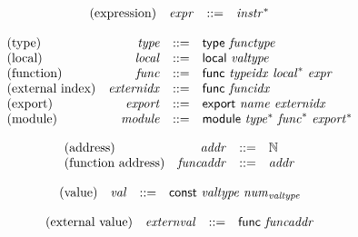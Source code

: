 \documentclass{article}
\begin{document}
\vspace{1ex}

$$
\begin{array}{@{}lrrl@{}l@{}}
	\mbox{(expression)} & {\mathit{expr}} &::=& {{\mathit{instr}}^\ast} \\
\end{array}
$$

\vspace{1ex}

$$
\begin{array}{@{}lrrl@{}l@{}}
	\mbox{(type)} & {\mathit{type}} &::=& \mathsf{type}~{\mathit{functype}} \\
	\mbox{(local)} & {\mathit{local}} &::=& \mathsf{local}~{\mathit{valtype}} \\
	\mbox{(function)} & {\mathit{func}} &::=& \mathsf{func}~{\mathit{typeidx}}~{{\mathit{local}}^\ast}~{\mathit{expr}} \\
	\mbox{(external index)} & {\mathit{externidx}} &::=& \mathsf{func}~{\mathit{funcidx}} \\
	\mbox{(export)} & {\mathit{export}} &::=& \mathsf{export}~{\mathit{name}}~{\mathit{externidx}} \\
	\mbox{(module)} & {\mathit{module}} &::=& \mathsf{module}~{{\mathit{type}}^\ast}~{{\mathit{func}}^\ast}~{{\mathit{export}}^\ast} \\
\end{array}
$$

\vspace{1ex}

$$
\begin{array}{@{}lrrl@{}l@{}}
	\mbox{(address)} & {\mathit{addr}} &::=& \mathbb{N} \\
	\mbox{(function address)} & {\mathit{funcaddr}} &::=& {\mathit{addr}} \\
\end{array}
$$

\vspace{1ex}

\vspace{1ex}

$$
\begin{array}{@{}lrrl@{}l@{}}
	\mbox{(value)} & {\mathit{val}} &::=& \mathsf{const}~{\mathit{valtype}}~{{\mathit{num}}}_{{\mathit{valtype}}} \\
\end{array}
$$

\vspace{1ex}

$$
\begin{array}{@{}lrrl@{}l@{}}
	\mbox{(external value)} & {\mathit{externval}} &::=& \mathsf{func}~{\mathit{funcaddr}} \\
\end{array}
$$
\end{document}
